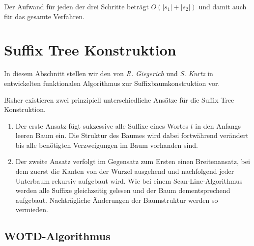 \documentclass[12pt]{report}
\newcommand{\abs}[1]{\left|#1\right|}
\begin{document}
Der Aufwand für jeden der drei Schritte beträgt $O(\abs{s_1} + \abs{s_2})$ und damit auch für das gesamte Verfahren.

\section{Suffix Tree Konstruktion}
\label{sec:SuffixTreeKonstruktion}

In diesem Abschnitt stellen wir den von \textit{R. Giegerich} und \textit{S. Kurtz} in \cite{Giegerich1995} entwickelten funktionalen Algorithmus zur Suffixbaumkonstruktion vor.

Bisher existieren zwei prinzipiell unterschiedliche Ansätze für die Suffix Tree Konstruktion.
\begin{enumerate}
     \item Der erste Ansatz fügt sukzessive alle Suffixe eines Wortes $t$ in den Anfangs leeren Baum ein. Die Struktur des Baumes wird dabei fortwährend verändert bis alle benötigten Verzweigungen im Baum vorhanden sind.
     \item Der zweite Ansatz verfolgt im Gegensatz zum Ersten einen Breitenansatz, bei dem zuerst die Kanten von der Wurzel ausgehend und nachfolgend jeder Unterbaum rekursiv aufgebaut wird. Wie bei einem Scan-Line-Algorithmus werden alle Suffixe gleichzeitig gelesen und der Baum dementsprechend aufgebaut. Nachträgliche Änderungen der Baumstruktur werden so vermieden.
 \end{enumerate}




\subsection{WOTD-Algorithmus}
\label{sec:WOTDAlgorithmus}
\end{document}
